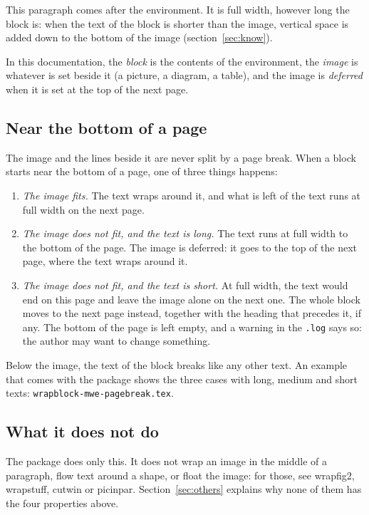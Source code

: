 \documentclass[a4paper,11pt]{article}
\newcommand\pkg[1]{\textsf{#1}}
\begin{document}
This paragraph comes after the environment. It is full width, however long the block is: when the text of the block is shorter than the image, vertical space is added down to the bottom of the image (section~\ref{sec:know}).

In this documentation, the \emph{block} is the contents of the environment, the \emph{image} is whatever is set beside it (a picture, a diagram, a table), and the image is \emph{deferred} when it is set at the top of the next page.

\subsection{Near the bottom of a page}\label{sec:bottom}

The image and the lines beside it are never split by a page break. When a block starts near the bottom of a page, one of three things happens:
\begin{enumerate}
\item \emph{The image fits.} The text wraps around it, and what is left of the text runs at full width on the next page.
\item \emph{The image does not fit, and the text is long.} The text runs at full width to the bottom of the page. The image is deferred: it goes to the top of the next page, where the text wraps around it.
\item \emph{The image does not fit, and the text is short.} At full width, the text would end on this page and leave the image alone on the next one. The whole block moves to the next page instead, together with the heading that precedes it, if any. The bottom of the page is left empty, and a warning in the \texttt{.log} says so: the author may want to change something.
\end{enumerate}
Below the image, the text of the block breaks like any other text. An example that comes with the package shows the three cases with long, medium and short texts: \texttt{wrapblock-mwe-pagebreak.tex}.

\subsection{What it does not do}

The package does only this. It does not wrap an image in the middle of a paragraph, flow text around a shape, or float the image: for those, see \pkg{wrapfig2}, \pkg{wrapstuff}, \pkg{cutwin} or \pkg{picinpar}. Section~\ref{sec:others} explains why none of them has the four properties above.
\end{document}
